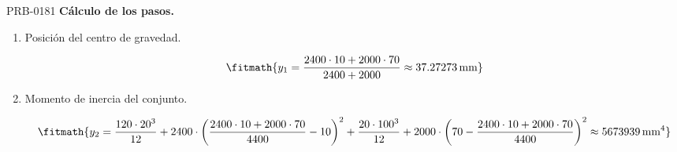 \begin{studiumworked}{PRB-0181}
\textbf{Cálculo de los pasos.}

\begin{enumerate}

\item Posición del centro de gravedad.

\[\fitmath{y_{1}=\frac{2400\cdot 10+2000\cdot 70}{2400+2000}\approx 37.27273\,\mathrm{mm}}\]

\item Momento de inercia del conjunto.

\[\fitmath{y_{2}=\frac{120\cdot {20}^{3}}{12}+2400\cdot {\left(\frac{2400\cdot 10+2000\cdot 70}{4400}-10\right)}^{2}+\frac{20\cdot {100}^{3}}{12}+2000\cdot {\left(70-\frac{2400\cdot 10+2000\cdot 70}{4400}\right)}^{2}\approx 5673939\,\mathrm{mm^{4}}}\]

\end{enumerate}


\end{studiumworked}
